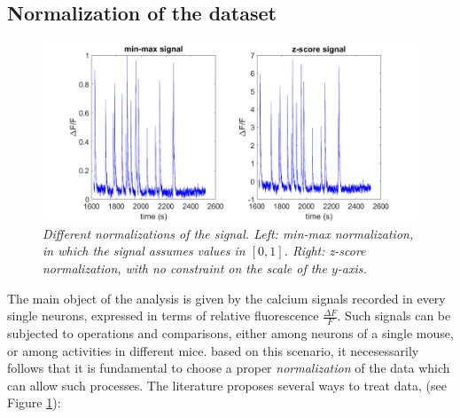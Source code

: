 \documentclass[12pt, a4paper]{article}
\begin{document}
\subsection{Normalization of the dataset}


\begin{figure}[H]
	
	\begin{center}
		\hspace*{-1.1cm}
		\includegraphics[scale=.4]{normalizations.png} 
	\end{center} 
	\caption{\textit{Different normalizations of the signal. Left: min-max normalization, in which the signal assumes values in $[0,1]$. Right: z-score normalization, with no constraint on the scale of the $y$-axis. }}
	\label{normalizations}
\end{figure}

The main object of the analysis is given by the calcium signals recorded in every single neurons, expressed in terms of relative fluorescence $\frac{\Delta F}{F}$. Such signals can be subjected to operations and comparisons, either among neurons of a single mouse, or among activities in different mice. based on this scenario, it necesessarily follows that it is fundamental to choose a proper \textit{normalization} of the data which can allow such processes. The literature proposes several ways to treat data, (see Figure \ref{normalizations}):
\end{document}
